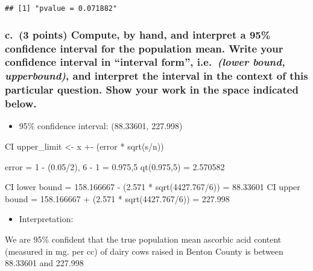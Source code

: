 \documentclass[
]{article}
\providecommand{\tightlist}{%
  \setlength{\itemsep}{0pt}\setlength{\parskip}{0pt}}
\begin{document}
\begin{verbatim}
## [1] "pvalue = 0.071882"
\end{verbatim}

\hypertarget{c.-3-points-compute-by-hand-and-interpret-a-95-confidence-interval-for-the-population-mean.-write-your-confidence-interval-in-interval-form-i.e.-lower-bound-upperbound-and-interpret-the-interval-in-the-context-of-this-particular-question.-show-your-work-in-the-space-indicated-below.}{%
\subsubsection{\texorpdfstring{c.~(3 points) Compute, by hand, and
interpret a 95\% confidence interval for the population mean. Write your
confidence interval in ``interval form'', i.e.~\emph{(lower bound,
upperbound)}, and interpret the interval \textbf{in the context of this
particular question}. Show your work in the space indicated
below.}{c.~(3 points) Compute, by hand, and interpret a 95\% confidence interval for the population mean. Write your confidence interval in ``interval form'', i.e.~(lower bound, upperbound), and interpret the interval in the context of this particular question. Show your work in the space indicated below.}}\label{c.-3-points-compute-by-hand-and-interpret-a-95-confidence-interval-for-the-population-mean.-write-your-confidence-interval-in-interval-form-i.e.-lower-bound-upperbound-and-interpret-the-interval-in-the-context-of-this-particular-question.-show-your-work-in-the-space-indicated-below.}}

\begin{itemize}
\tightlist
\item
  95\% confidence interval: (88.33601, 227.998)
\end{itemize}

CI upper\_limit \textless- x +- (error * sqrt(s/n))

error = 1 - (0.05/2), 6 - 1 = 0.975,5 qt(0.975,5) = 2.570582

CI lower bound = 158.166667 - (2.571 * sqrt(4427.767/6)) = 88.33601 CI
upper bound = 158.166667 + (2.571 * sqrt(4427.767/6)) = 227.998

\begin{itemize}
\tightlist
\item
  Interpretation:
\end{itemize}

We are 95\% confident that the true population mean ascorbic acid
content (measured in mg. per cc) of dairy cows raised in Benton County
is between 88.33601 and 227.998
\end{document}
